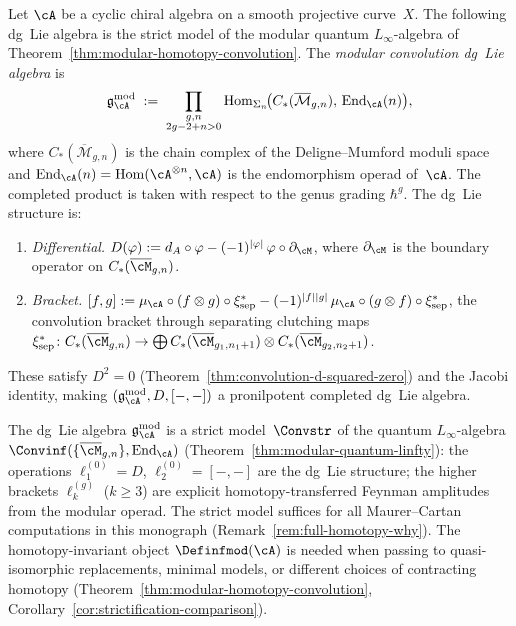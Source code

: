 \begin{definition}
\label{def:modular-convolution-dg-lie}
Let $\cA$ be a cyclic chiral algebra on a smooth projective curve~$X$.
The following dg~Lie algebra is the strict model of the modular
quantum $L_\infty$-algebra of
Theorem~\ref{thm:modular-homotopy-convolution}.
The \emph{modular convolution dg~Lie algebra} is
\begin{equation}
\label{eq:modular-convolution}
\mathfrak{g}_{\cA}^{\mathrm{mod}}
\;:=\;
\prod_{\substack{g,n \\ 2g-2+n > 0}}
\operatorname{Hom}_{\Sigma_n}\!\bigl(
C_*(\overline{\mathcal{M}}_{g,n}),\,
\operatorname{End}_{\cA}(n)
\bigr),
\end{equation}
where $C_*(\overline{\mathcal{M}}_{g,n})$ is the chain complex of
the Deligne--Mumford moduli space and
$\operatorname{End}_{\cA}(n) = \operatorname{Hom}(\cA^{\otimes n}, \cA)$
is the endomorphism operad of~$\cA$.  The completed product is taken
with respect to the genus grading $\hbar^g$.
The dg~Lie structure is:
\begin{enumerate}[label=\textup{(\roman*)}]
\item \emph{Differential.}\;
  $D(\varphi) := d_A \circ \varphi
  - (-1)^{|\varphi|}\, \varphi \circ \partial_{\cM}$,
  where $\partial_{\cM}$ is the boundary operator on
  $C_*(\overline{\cM}_{g,n})$.
\item \emph{Bracket.}\;
  $[f, g] := \mu_\cA \circ (f \otimes g)
  \circ \xi_{\mathrm{sep}}^*
  - (-1)^{|f||g|}\, \mu_\cA \circ (g \otimes f)
  \circ \xi_{\mathrm{sep}}^*$,
  the convolution bracket through separating clutching maps
  $\xi_{\mathrm{sep}}^*\colon
  C_*(\overline{\cM}_{g,n}) \to
  \bigoplus C_*(\overline{\cM}_{g_1,n_1+1}) \otimes
  C_*(\overline{\cM}_{g_2,n_2+1})$.
\end{enumerate}
These satisfy $D^2 = 0$
(Theorem~\ref{thm:convolution-d-squared-zero}) and the Jacobi
identity, making
$(\mathfrak{g}_\cA^{\mathrm{mod}}, D, [-,-])$
a pronilpotent completed dg~Lie algebra.
\end{definition}

\begin{remark}
\label{rem:modular-conv-strict-model}
\label{rem:homotopy-level-convolution}
The dg~Lie algebra $\mathfrak{g}_{\cA}^{\mathrm{mod}}$ is a strict
model~$\Convstr$ of the quantum $L_\infty$-algebra
$\Convinf(\{\overline{\cM}_{g,n}\}, \operatorname{End}_{\cA})$
\textup{(}Theorem~\textup{\ref{thm:modular-quantum-linfty}}):
the operations $\ell_1^{(0)} = D$, $\ell_2^{(0)} = [-,-]$ are the
dg~Lie structure; the higher brackets $\ell_k^{(g)}$ ($k \geq 3$)
are explicit homotopy-transferred Feynman amplitudes from the
modular operad.
The strict model suffices for all Maurer--Cartan computations in
this monograph
\textup{(}Remark~\textup{\ref{rem:full-homotopy-why})}.
The homotopy-invariant object $\Definfmod(\cA)$ is needed when
passing to quasi-isomorphic replacements, minimal models, or
different choices of contracting homotopy
\textup{(}Theorem~\textup{\ref{thm:modular-homotopy-convolution}},
Corollary~\textup{\ref{cor:strictification-comparison})}.
\end{remark}


